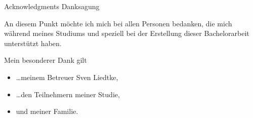 \makeatletter
{}
{}
{}
\makeatother
\thispagestyle{empty}

\vspace*{20mm}

\begin{center}
\makeatletter
{}
{ Acknowledgments}
{ Danksagung}
\makeatother
\end{center}

\vspace{10mm}

An diesem Punkt möchte ich mich bei allen Personen bedanken, die mich während meines Studiums und speziell bei der Erstellung dieser Bachelorarbeit unterstützt haben.

\vspace{10mm}

Mein besonderer Dank gilt

\begin{itemize}
	\item \dots meinem Betreuer Sven Liedtke, 
	\item \dots den Teilnehmern meiner Studie,
	\item und meiner Familie.
\end{itemize}

\cleardoublepage{}
